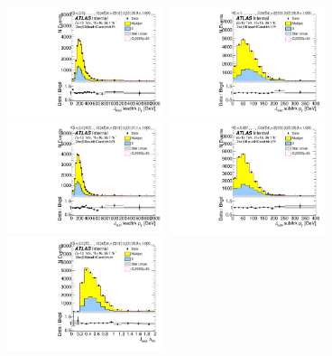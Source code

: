 \begin{figure}[htb!]
\begin{center}
\includegraphics[width=0.41\textwidth,angle=-90]{figures/boosted/Sideband/b77_TwoTag_split_Sideband_leadHCand_trk0_Pt.pdf}
\includegraphics[width=0.41\textwidth,angle=-90]{figures/boosted/Sideband/b77_TwoTag_split_Sideband_leadHCand_trk1_Pt.pdf}\\
\includegraphics[width=0.41\textwidth,angle=-90]{figures/boosted/Sideband/b77_TwoTag_split_Sideband_sublHCand_trk0_Pt.pdf}
\includegraphics[width=0.41\textwidth,angle=-90]{figures/boosted/Sideband/b77_TwoTag_split_Sideband_sublHCand_trk1_Pt.pdf}\\
\includegraphics[width=0.41\textwidth,angle=-90]{figures/boosted/Sideband/b77_TwoTag_split_Sideband_leadHCand_trk_dr.pdf}

\end{center}
\end{figure}

